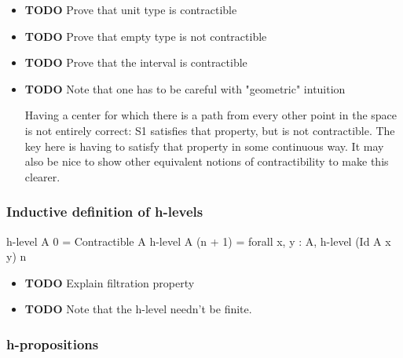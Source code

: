 \begin{itemize}

\item \textbf{TODO} Prove that unit type is contractible\\
\label{sec-2.3.2.1}


\item \textbf{TODO} Prove that empty type is not contractible\\
\label{sec-2.3.2.2}


\item \textbf{TODO} Prove that the interval is contractible\\
\label{sec-2.3.2.3}


\item \textbf{TODO} Note that one has to be careful with "geometric" intuition\\
\label{sec-2.3.2.4}

Having a center for which there is a path from every other point in
the space is not entirely correct: S1 satisfies that property, but is
not contractible. The key here is having to satisfy that property in
some continuous way. It may also be nice to show other equivalent
notions of contractibility to make this clearer.

\end{itemize} %
\subsubsection{Inductive definition of h-levels}
\label{sec-2.3.3}


\begin{code}
  h-level A 0 = Contractible A
  h-level A (n + 1) = forall x, y : A, h-level (Id A x y) n
\end{code}

\begin{itemize}

\item \textbf{TODO} Explain filtration property\\
\label{sec-2.3.3.1}


\item \textbf{TODO} Note that the h-level needn't be finite.\\
\label{sec-2.3.3.2}


\end{itemize} %
\subsubsection{h-propositions}
\label{sec-2.3.4}


